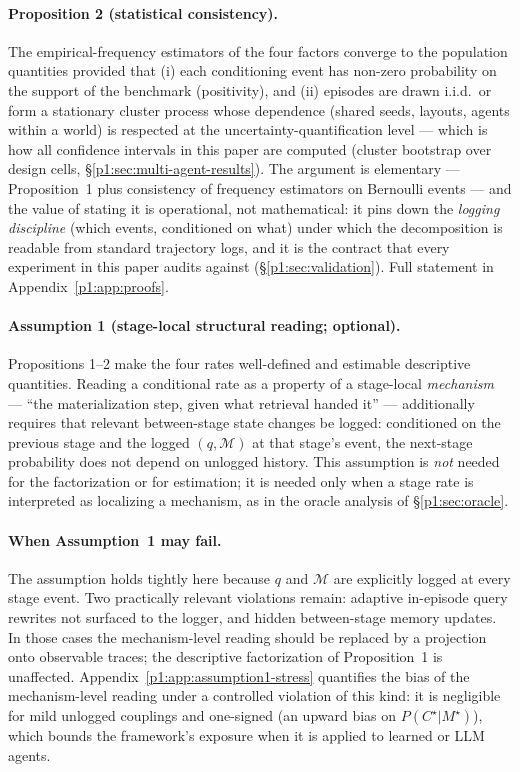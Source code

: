 \documentclass{article}
\begin{document}
\paragraph{Proposition 2 (statistical consistency).}
The empirical-frequency estimators of the four factors converge to the
population quantities provided that (i) each conditioning event has
non-zero probability on the support of the benchmark (positivity), and
(ii) episodes are drawn i.i.d.\ or form a stationary cluster process
whose dependence (shared seeds, layouts, agents within a world) is
respected at the uncertainty-quantification level --- which is how all
confidence intervals in this paper are computed (cluster bootstrap
over design cells, \S\ref{p1:sec:multi-agent-results}). The argument
is elementary --- Proposition~1 plus consistency of frequency
estimators on Bernoulli events --- and the value of stating it is
operational, not mathematical: it pins down the \emph{logging
discipline} (which events, conditioned on what) under which the
decomposition is readable from standard trajectory logs, and it is the
contract that every experiment in this paper audits against
(\S\ref{p1:sec:validation}). Full statement in
Appendix~\ref{p1:app:proofs}.

\paragraph{Assumption 1 (stage-local structural reading; optional).}
Propositions 1--2 make the four rates well-defined and estimable
descriptive quantities. Reading a conditional rate as a property of a
stage-local \emph{mechanism} --- ``the materialization step, given
what retrieval handed it'' --- additionally requires that relevant
between-stage state changes be logged: conditioned on the previous
stage and the logged $(q, \mathcal{M})$ at that stage's event, the
next-stage probability does not depend on unlogged history. This
assumption is \emph{not} needed for the factorization or for
estimation; it is needed only when a stage rate is interpreted as
localizing a mechanism, as in the oracle analysis of
\S\ref{p1:sec:oracle}.

\paragraph{When Assumption~1 may fail.}
The assumption holds tightly here because $q$ and $\mathcal{M}$ are
explicitly logged at every stage event. Two practically relevant
violations remain: adaptive in-episode query rewrites not surfaced to
the logger, and hidden between-stage memory updates. In those cases
the mechanism-level reading should be replaced by a projection onto
observable traces; the descriptive factorization of Proposition~1 is
unaffected. Appendix~\ref{p1:app:assumption1-stress} quantifies the
bias of the mechanism-level reading under a controlled violation of
this kind: it is negligible for mild unlogged couplings and one-signed
(an upward bias on $P(C^\star|M^\star)$), which bounds the framework's
exposure when it is applied to learned or LLM agents.
\end{document}
